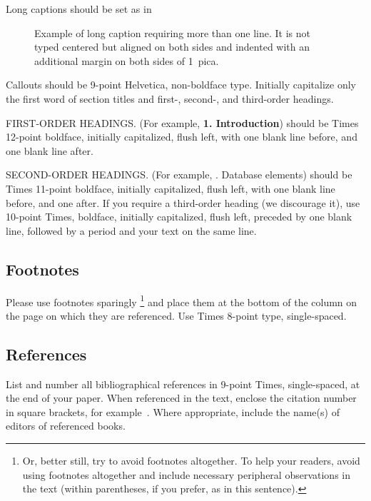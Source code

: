 \noindent Long captions should be set as in 
\begin{figure}[h] 
   \caption{Example of long caption requiring more than one line. It is 
     not typed centered but aligned on both sides and indented with an 
     additional margin on both sides of 1~pica.}
\end{figure}

\noindent Callouts should be 9-point Helvetica, non-boldface type. 
Initially capitalize only the first word of section titles and first-, 
second-, and third-order headings.

FIRST-ORDER HEADINGS. (For example, {\large \bf 1. Introduction}) 
should be Times 12-point boldface, initially capitalized, flush left, 
with one blank line before, and one blank line after.

SECOND-ORDER HEADINGS. (For example, {. Database elements}) 
should be Times 11-point boldface, initially capitalized, flush left, 
with one blank line before, and one after. If you require a third-order 
heading (we discourage it), use 10-point Times, boldface, initially 
capitalized, flush left, preceded by one blank line, followed by a period 
and your text on the same line.

\subsection{Footnotes}

Please use footnotes sparingly%
\footnote
   {%
     Or, better still, try to avoid footnotes altogether.  To help your 
     readers, avoid using footnotes altogether and include necessary 
     peripheral observations in the text (within parentheses, if you 
     prefer, as in this sentence).
   }
and place them at the bottom of the column on the page on which they are 
referenced. Use Times 8-point type, single-spaced.


\subsection{References}

List and number all bibliographical references in 9-point Times, 
single-spaced, at the end of your paper. When referenced in the text, 
enclose the citation number in square brackets, for example~\cite{ex1}. 
Where appropriate, include the name(s) of editors of referenced books.

